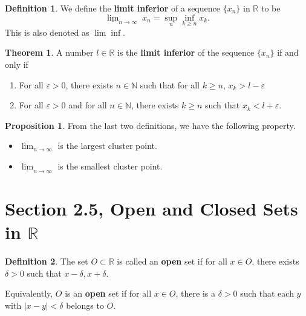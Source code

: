 \documentclass[12pt]{article}
\newcommand{\R}{\mathbb{R}}
\newcommand{\N}{\mathbb{N}}
\renewcommand{\epsilon}{\varepsilon}
\theoremstyle{definition}
\newtheorem*{thm}{Theorem}
\newtheorem*{definition}{Definition}
\newtheorem{prop}{Proposition}
\begin{document}
\begin{definition}
    We define the \textbf{limit inferior} of a sequence \( \{ x_n \} \) in \( \R \) to be 
        \[
            \underline{\lim}_{n \to \infty} \ x_n = \sup_{n} \inf_{k \geq n} x_k. 
        \]
    This is also denoted as \( \lim \inf \).
\end{definition}

\begin{thm}
    A number \( l \in \R \) is the \textbf{limit inferior} of the sequence \( \{ x_n \} \) if and only if 
        \begin{enumerate}[label = (\roman{*})]
            \item For all \( \epsilon > 0 \), there exists \( n \in \N \) such that for all \( k \geq n\), \( x_k > l - \epsilon \)
            \item For all \( \epsilon > 0 \) and for all \( n \in \N \), there exists \( k \geq n \) such that \( x_{k} < l + \epsilon \). 
        \end{enumerate}
\end{thm}

\begin{prop}
    From the last two definitions, we have the following property.
    \begin{itemize}

        \item \( \overline{\lim}_{n \to \infty} \) is the largest cluster point.
        \item \( \underline{\lim}_{n \to \infty} \) is the smallest cluster point.
    \end{itemize}
    
\end{prop}

\section*{Section 2.5, Open and Closed Sets in \( \R \)}

\begin{definition}
    The set \( O \subset \R \) is called an \textbf{open} set if for all \( x \in O \), there exists \( \delta > 0 \) such that \( x - \delta, x + \delta \).

    Equivalently, \( O \) is an \textbf{open} set if for all \( x \in O \), there is a \( \delta > 0 \) such that each \( y \) with \( |x - y| < \delta \) belongs to \( O \).
\end{definition}
\end{document}
